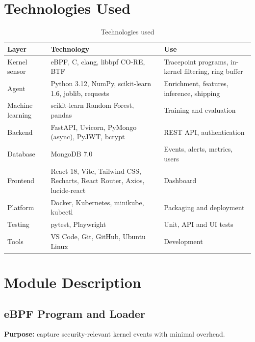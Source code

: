 \section{Technologies Used}

\begin{table}[H]
\centering
\caption{Technologies used}
\label{tab:tech}
\small
\begin{tabularx}{\textwidth}{>{\raggedright\arraybackslash}p{3.2cm} >{\raggedright\arraybackslash}p{4.0cm} >{\raggedright\arraybackslash}X}
\toprule
\textbf{Layer} & \textbf{Technology} & \textbf{Use} \\
\midrule
Kernel sensor & eBPF, C, clang, libbpf CO-RE, BTF & Tracepoint programs, in-kernel filtering, ring buffer \\
Agent & Python 3.12, NumPy, scikit-learn 1.6, joblib, requests & Enrichment, features, inference, shipping \\
Machine learning & scikit-learn Random Forest, pandas & Training and evaluation \\
Backend & FastAPI, Uvicorn, PyMongo (async), PyJWT, bcrypt & REST API, authentication \\
Database & MongoDB 7.0 & Events, alerts, metrics, users \\
Frontend & React 18, Vite, Tailwind CSS, Recharts, React Router, Axios, lucide-react & Dashboard \\
Platform & Docker, Kubernetes, minikube, kubectl & Packaging and deployment \\
Testing & pytest, Playwright & Unit, API and UI tests \\
Tools & VS Code, Git, GitHub, Ubuntu Linux & Development \\
\bottomrule
\end{tabularx}
\end{table}

\section{Module Description}

\subsection{eBPF Program and Loader}

\textbf{Purpose:} capture security-relevant kernel events with minimal overhead.

